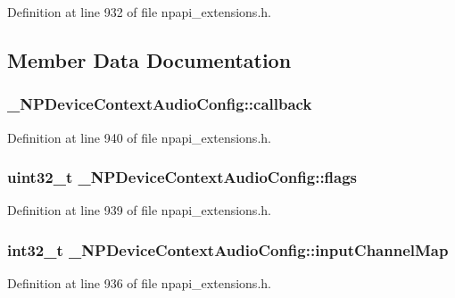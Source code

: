 Definition at line 932 of file npapi\_\-extensions.h.



\subsection{Member Data Documentation}
\hypertarget{struct___n_p_device_context_audio_config_a913925b7c8aceb040e26433e9b68b577}{
\subsubsection[{callback}]{ {\bf \_\-NPDeviceContextAudioConfig::callback}}}
\label{struct___n_p_device_context_audio_config_a913925b7c8aceb040e26433e9b68b577}


Definition at line 940 of file npapi\_\-extensions.h.

\hypertarget{struct___n_p_device_context_audio_config_a50ce2ce4d00b584205cdfe725d43c760}{
\subsubsection[{flags}]{\setlength{\rightskip}{0pt plus 5cm}uint32\_\-t {\bf \_\-NPDeviceContextAudioConfig::flags}}}
\label{struct___n_p_device_context_audio_config_a50ce2ce4d00b584205cdfe725d43c760}


Definition at line 939 of file npapi\_\-extensions.h.

\hypertarget{struct___n_p_device_context_audio_config_a69c0328c3256924a80490c75b643cfd9}{
\subsubsection[{inputChannelMap}]{\setlength{\rightskip}{0pt plus 5cm}int32\_\-t {\bf \_\-NPDeviceContextAudioConfig::inputChannelMap}}}
\label{struct___n_p_device_context_audio_config_a69c0328c3256924a80490c75b643cfd9}


Definition at line 936 of file npapi\_\-extensions.h.

